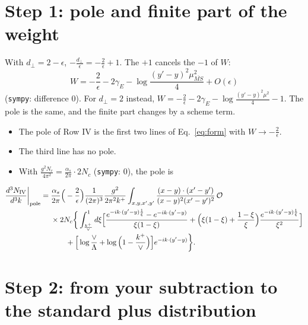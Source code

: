 \documentclass[10pt]{article}
\numberwithin{equation}{section}
\newcommand{\OO}{\mathcal O}
\newcommand{\preLO}{\frac{1}{(2\pi)^3}\frac{g^2}{2\pi^2k^+}}
\newcommand{\XX}{\frac{(x-y)\cdot(x'-y')}{(x-y)^{2}(x'-y')^{2}}}
\newcommand{\ph}{e^{-ik\cdot(y'-y)\frac{1}{\xi}}}
\newcommand{\phone}{e^{-ik\cdot(y'-y)}}
\begin{document}
\section{Step 1: pole and finite part of the weight}\label{sec:W}
With $d_\perp=2-\epsilon$, $-\frac{d_\perp}{\epsilon}=-\frac{2}{\epsilon}+1$. The $+1$ cancels the $-1$ of $W$:
\begin{equation}
W=-\frac{2}{\epsilon}-2\gamma_E-\log\frac{(y'-y)^2\mu^2_{\overline{MS}}}{4}+O(\epsilon)
\label{eq:W}
\end{equation}
(\texttt{sympy}: difference $0$). For $d_\perp=2$ instead, $W=-\frac2\epsilon-2\gamma_E-\log\frac{(y'-y)^2\mu^2}{4}-1$. The pole is the same, and the finite part changes by a scheme term.
\begin{itemize}
\item The pole of Row IV is the first two lines of Eq.~\eqref{eq:form} with $W\to-\frac2\epsilon$.
\item The third line has no pole.
\item With $\frac{g^2N_c}{4\pi^2}=\frac{\alpha_s}{2\pi}\cdot2N_c$ (\texttt{sympy}: $0$), the pole is
\end{itemize}
\begin{align}
\frac{d^{3}N_{\rm IV}}{d^{3}k}\bigg|_{\rm pole}={}&\frac{\alpha_s}{2\pi}\Big(-\frac{2}{\epsilon}\Big)\preLO\int_{x,y,x',y'}\XX\,\OO\notag\\
&\times2N_c\bigg\{\int_{\frac{k^{+}}{\vee}}^{1}d\xi\Big[\frac{\ph-\phone}{\xi(1-\xi)}+\Big(\xi(1-\xi)+\frac{1-\xi}{\xi}\Big)\frac{\ph}{\xi^2}\Big]\notag\\
&\qquad+\Big[\log\frac{\vee}{\Lambda}+\log\Big(1-\frac{k^{+}}{\vee}\Big)\Big]\phone\bigg\}.
\label{eq:poleu}
\end{align}

\section{Step 2: from your subtraction to the standard plus distribution}\label{sec:conv}
\end{document}
